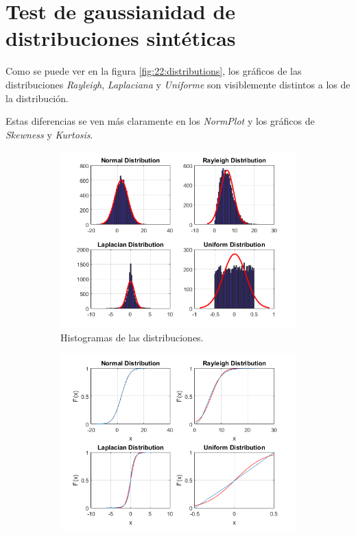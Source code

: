 \documentclass[11pt]{article} %
\begin{document}
\section{Test de gaussianidad de distribuciones sintéticas}

Como se puede ver en la figura \ref{fig:22:distributions}, los gráficos de las distribuciones \emph{Rayleigh}, \emph{Laplaciana} y \emph{Uniforme} son visiblemente distintos a los de la distribución. 

Estas diferencias se ven más claramente en los \emph{NormPlot} y los gráficos de \emph{Skewness} y \emph{Kurtosis}.

\begin{figure}[h]
	\centering
	\begin{subfigure}[b]{0.475 \textwidth}
		\centering
		\includegraphics[width=\textwidth]{./22/hist.png}
		\caption[]{{\small Histogramas de las distribuciones.}}    
		\label{fig:22:histogram}
	\end{subfigure}
	\hfill
	\begin{subfigure}[b]{0.475 \textwidth}  
		\centering 
		\includegraphics[width=\textwidth]{./22/cdfplot.png}

\end{subfigure}
\end{figure}
\end{document}
